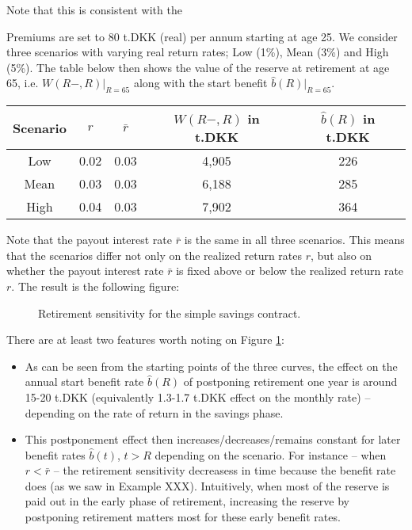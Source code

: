 \documentclass{book}
\newcommand{\1}[1]{\mathbbm{1}_{\left\lbrace #1 \right\rbrace}}
\theoremstyle{break}
\theoremstyle{remark}
\numberwithin{equation}{section}
\begin{document}
Note that this is consistent with the 

\begin{example}
Premiums are set to 80 t.DKK (real) per annum starting at age 25. We consider three scenarios with varying real return rates; Low (1\%), Mean (3\%) and High (5\%). The table below then shows the value of the reserve at retirement at age 65, i.e. $W(R-,R)|_{R=65}$ along with the start benefit $\hat{b}(R)|_{R=65}$.

\begin{center}
	\begin{tabular}{ |c|c|c|c|c| }
		\hline
		Scenario & $r$ & $\bar{r}$ & $W(R-,R)$ in t.DKK & $\hat{b}(R)$ in t.DKK \\
		\hline
		Low & 0.02 & 0.03 & 4,905 & 226 \\
		Mean & 0.03 & 0.03 & 6,188 & 285 \\
		High & 0.04 & 0.03 & 7,902 & 364 \\
		\hline
	\end{tabular}
\end{center}

Note that the payout interest rate $\bar{r}$ is the same in all three scenarios. This means that the scenarios differ not only on the realized return rates $r$, but also on whether the payout interest rate $\bar{r}$ is fixed above or below the realized return rate $r$. The result is the following figure:

\begin{figure}[H] \label{RSensiGraph}
	\centering
	\caption{Retirement sensitivity for the simple savings contract.}
\end{figure}

There are at least two features worth noting on Figure \ref{RSensiGraph}:

\begin{itemize}
	\item As can be seen from the starting points of the three curves, the effect on the annual start benefit rate $\hat{b}(R)$ of postponing retirement one year is around 15-20 t.DKK (equivalently 1.3-1.7 t.DKK effect on the monthly rate) -- depending on the rate of return in the savings phase.
	\item This postponement effect then increases/decreases/remains constant for later benefit rates $\hat{b}(t)$, $t>R$ depending on the scenario. For instance -- when $r < \bar{r}$ -- the retirement sensitivity decreasess in time because the benefit rate does (as we saw in Example XXX). Intuitively, when most of the reserve is paid out in the early phase of retirement, increasing the reserve by postponing retirement matters most for these early benefit rates.
\end{itemize}

\end{example}
\end{document}
